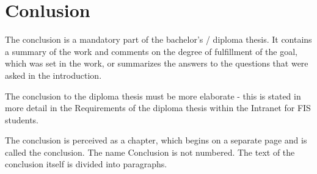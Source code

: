 \chapter*{Conlusion}

The conclusion is a mandatory part of the bachelor's / diploma thesis. It contains a summary of the work and comments on the degree of fulfillment of the goal, which was set in the work, or summarizes the answers to the questions that were asked in the introduction.

The conclusion to the diploma thesis must be more elaborate - this is stated in more detail in the Requirements of the diploma thesis within the Intranet for FIS students.

The conclusion is perceived as a chapter, which begins on a separate page and is called the conclusion. The name Conclusion is not numbered. The text of the conclusion itself is divided into paragraphs.
